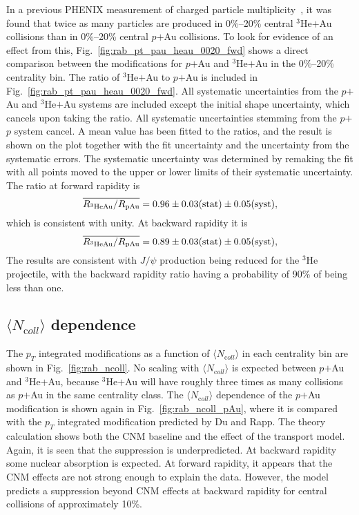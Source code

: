 \documentclass[twocolumn,letterpaper,aps,prc,longbibliography,superscriptaddress,nofootinbib,floatfix]{revtex4-1}
\newcommand{\pt}{\mbox{$p_T$}\xspace}
\newcommand{\meanncoll}{\mbox{$\langle N_{\mathrm coll} \rangle$}\xspace}
\newcommand{\pp}{\mbox{$p$$+$$p$}\xspace}
\newcommand{\pau}{\mbox{$p$$+$Au}\xspace}
\newcommand{\heau}{\mbox{$^{3}$He$+$Au}\xspace}
\newcommand{\jpsi}{\mbox{$J/\psi$}\xspace}
\begin{document}
In a previous PHENIX measurement of charged particle 
multiplicity~\cite{Adare:2018toe}, it was found that twice as many 
particles are produced in 0\%--20\% central \heau collisions than in 
0\%--20\% central \pau collisions. To look for evidence of an effect 
from this, Fig.~\ref{fig:rab_pt_pau_heau_0020_fwd} shows a direct 
comparison between the modifications for \pau and \heau in the 0\%--20\% 
centrality bin. The ratio of \heau to \pau is included in 
Fig.~\ref{fig:rab_pt_pau_heau_0020_fwd}.  All systematic uncertainties 
from the \pau and \heau systems are included except the initial shape 
uncertainty, which cancels upon taking the ratio.  All systematic 
uncertainties stemming from the \pp system cancel.  A mean value has 
been fitted to the ratios, and the result is shown on the plot together 
with the fit uncertainty and the uncertainty from the systematic errors.  
The systematic uncertainty was determined by remaking the fit with all 
points moved to the upper or lower limits of their systematic 
uncertainty. The ratio at forward rapidity is 
\begin{equation}
\overline{R_{^{3}{\rm HeAu}}/R_{{\rm pAu}}}
= 0.96\pm0.03{\rm (stat)}\pm0.05{\rm (syst)}, \nonumber
\end{equation}
which is consistent with unity.  At backward rapidity it is 
\begin{equation}
\overline{R_{^{3}{\rm HeAu}}/R_{{\rm pAu}}}
= 0.89\pm0.03{\rm (stat)}\pm0.05{\rm (syst)},  \nonumber
\end{equation}
The results are consistent with \jpsi production being reduced for the 
$^3$He projectile, with the backward rapidity ratio having a probability 
of 90\% of being less than one.

\subsection{\meanncoll dependence}

The \pt integrated modifications as a function of \meanncoll in each 
centrality bin are shown in Fig.~\ref{fig:rab_ncoll}. No scaling with 
\meanncoll is expected between \pau and \heau, because \heau will have 
roughly three times as many collisions as \pau in the same centrality 
class. The \meanncoll dependence of the \pau modification is shown again 
in Fig.~\ref{fig:rab_ncoll_pAu}, where it is compared with the \pt 
integrated modification predicted by Du and Rapp. The theory calculation 
shows both the CNM baseline and the effect of the transport model. 
Again, it is seen that the suppression is underpredicted. At backward 
rapidity some nuclear absorption is expected. At forward rapidity, it 
appears that the CNM effects are not strong enough to explain the data. 
However, the model predicts a suppression beyond CNM effects at backward 
rapidity for central collisions of approximately 10\%.
\end{document}
